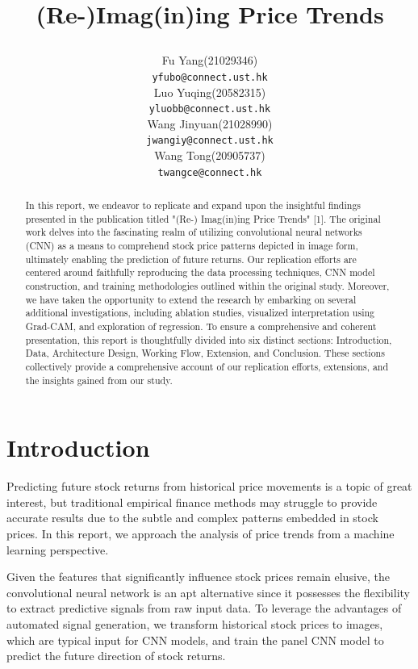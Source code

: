 \documentclass{article}
\title{

(Re-)Imag(in)ing Price Trends}
\author{%
  Fu Yang(21029346) \\
  \texttt{yfubo@connect.ust.hk} \\
  \And
  Luo Yuqing(20582315)\\
  \texttt{yluobb@connect.ust.hk} \\
  \AND
  Wang Jinyuan(21028990)\\
  \texttt{jwangiy@connect.ust.hk} \\
  \And
  Wang Tong(20905737) \\
  \texttt{twangce@connect.hk} \\
}
\begin{document}
\maketitle

\begin{abstract}

In this report, we endeavor to replicate and expand upon the insightful findings presented in the publication titled "(Re-) Imag(in)ing Price Trends" [1]. The original work delves into the fascinating realm of utilizing convolutional neural networks (CNN) as a means to comprehend stock price patterns depicted in image form, ultimately enabling the prediction of future returns. Our replication efforts are centered around faithfully reproducing the data processing techniques, CNN model construction, and training methodologies outlined within the original study. Moreover, we have taken the opportunity to extend the research by embarking on several additional investigations, including ablation studies, visualized interpretation using Grad-CAM, and exploration of regression. To ensure a comprehensive and coherent presentation, this report is thoughtfully divided into six distinct sections: Introduction, Data, Architecture Design, Working Flow, Extension, and Conclusion. These sections collectively provide a comprehensive account of our replication efforts, extensions, and the insights gained from our study.


\end{abstract}

\section{Introduction}

Predicting future stock returns from historical price movements is a topic of great interest, but traditional empirical finance methods may struggle to provide accurate results due to the subtle and complex patterns embedded in stock prices. In this report, we approach the analysis of price trends from a machine learning perspective.

Given the features that significantly influence stock prices remain elusive, the convolutional neural network is an apt alternative since it possesses the flexibility to extract predictive signals from raw input data. To leverage the advantages of automated signal generation, we transform historical stock prices to images, which are typical input for CNN models, and train the panel CNN model to predict the future direction of stock returns. 
\end{document}
